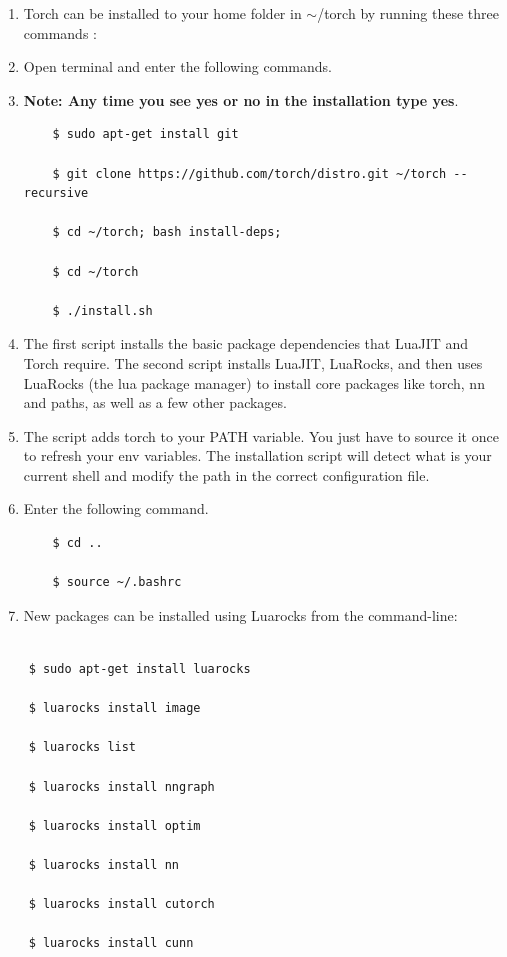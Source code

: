 \documentclass[12pt]{article}
\begin{document}
\begin{enumerate}
    \item Torch can be installed to your home folder in {\tiny $\sim$}/torch by running these three commands \cite{TORCH}:
    \item Open terminal and enter the following commands.
    \item \textbf{Note: Any time you see yes or no in the installation type yes}.

\begin{lstlisting}
    $ sudo apt-get install git

    $ git clone https://github.com/torch/distro.git ~/torch --recursive

    $ cd ~/torch; bash install-deps;

    $ cd ~/torch

    $ ./install.sh
\end{lstlisting}

    \item The first script installs the basic package dependencies that LuaJIT and Torch require. The second script installs LuaJIT, LuaRocks, and then uses LuaRocks (the lua package manager) to install core packages like torch, nn and paths, as well as a few other packages.

    \item The script adds torch to your PATH variable. You just have to source it once to refresh your env variables. The installation script will detect what is your current shell and modify the path in the correct configuration file.
    \item Enter the following command.

\begin{lstlisting}
    $ cd ..

    $ source ~/.bashrc
\end{lstlisting}

    \item New packages can be installed using Luarocks from the command-line:
\end{enumerate}

\begin{lstlisting}

    $ sudo apt-get install luarocks

    $ luarocks install image

    $ luarocks list

    $ luarocks install nngraph

    $ luarocks install optim

    $ luarocks install nn

    $ luarocks install cutorch

    $ luarocks install cunn

\end{lstlisting}
\end{document}
